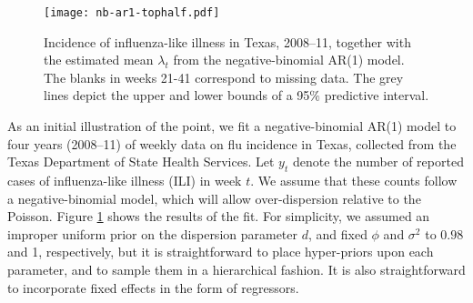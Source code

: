 \documentclass[11pt]{article}
\newcommand{\Polya}{P\'{o}lya}
\begin{document}


\begin{figure}
\begin{center}
\texttt{[image: nb-ar1-tophalf.pdf]}
\caption{\label{fig:nb-ar1} Incidence of influenza-like illness in Texas,
  2008--11, together with the estimated mean $\lambda_t$ from the
  negative-binomial AR(1) model.  The blanks in weeks 21-41 correspond to
  missing data.  The grey lines depict the upper and lower bounds of a 95$\%$
  predictive interval.}
\end{center}
\end{figure}

As an initial illustration of the point, we fit a negative-binomial AR(1) model
to four years (2008--11) of weekly data on flu incidence in Texas, collected
from the Texas Department of State Health Services.  Let $y_t$ denote the number
of reported cases of influenza-like illness (ILI) in week $t$.  We assume that
these counts follow a negative-binomial model, which will allow over-dispersion
relative to the Poisson.
Figure \ref{fig:nb-ar1} shows the results of the fit. For simplicity, we assumed
an improper uniform prior on the dispersion parameter $d$, and fixed $\phi$ and
$\sigma^2$ to $0.98$ and 1, respectively, but it is straightforward to place
hyper-priors upon each parameter, and to sample them in a hierarchical fashion.
It is also straightforward to incorporate fixed effects in the form of
regressors.

\end{document}
